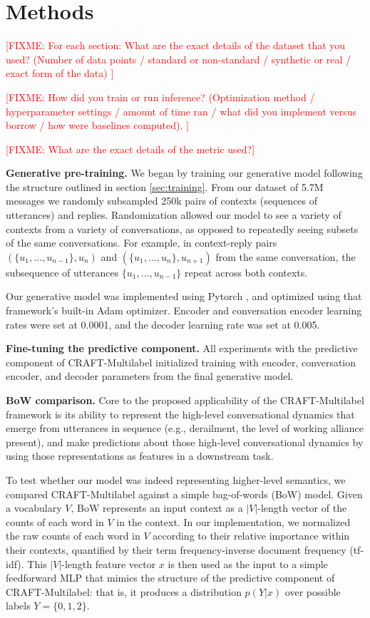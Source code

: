 \documentclass{article}
\newcommand{\fixme}[1]{\textcolor{red}{[FIXME: #1]}}
\begin{document}
\section{Methods}
\label{sec:methods}

\fixme{For each section: What are the exact details of the dataset that you used? (Number of data points / standard or non-standard / synthetic or real / exact form of the data)
}

\fixme{
How did you train or run inference? (Optimization method / hyperparameter settings / amount of time ran / what did you implement versus borrow / how were baselines computed).
}

\fixme{What are the exact details of the metric used?}

\textbf{Generative pre-training.} We began by training our generative model following the structure outlined in section \ref{sec:training}. From our dataset of 5.7M messages we randomly subsampled 250k pairs of contexts (sequences of utterances) and replies. Randomization allowed our model to see a variety of contexts from a variety of conversations, as opposed to repeatedly seeing subsets of the same conversations. For example, in context-reply pairs $(\{u_1,...,u_{n-1}\}, u_{n})$ and $(\{u_1,...,u_{n}\}, u_{n+1})$ from the same conversation, the subsequence of utterances $\{u_1,...,u_{n-1}\}$ repeat across both contexts.

Our generative model was implemented using Pytorch \cite{pytorch}, and optimized using that framework's built-in Adam optimizer. Encoder and conversation encoder learning rates were set at 0.0001, and the decoder learning rate was set at 0.005.

\textbf{Fine-tuning the predictive component.} All experiments with the predictive component of CRAFT-Multilabel initialized training with encoder, conversation encoder, and decoder parameters from the final generative model.  

\textbf{BoW comparison.} Core to the proposed applicability of the CRAFT-Multilabel framework is its ability to represent the high-level conversational dynamics that emerge from utterances in sequence (e.g., derailment, the level of working alliance present), and make predictions about those high-level conversational dynamics by using those representations as features in a downstream task. 

To test whether our model was indeed representing higher-level semantics, we compared CRAFT-Multilabel against a simple bag-of-words (BoW) model. Given a vocabulary $V$, BoW represents an input context as a $|V|$-length vector of the counts of each word in $V$ in the context. In our implementation, we normalized the raw counts of each word in $V$ according to their relative importance within their contexts, quantified by their term frequency-inverse document frequency (tf-idf). This $|V|$-length feature vector $x$ is then used as the input to a simple feedforward MLP that mimics the structure of the predictive component of CRAFT-Multilabel: that is, it produces a distribution $p(Y|x)$ over possible labels $Y=\{0,1,2\}$.
\end{document}
